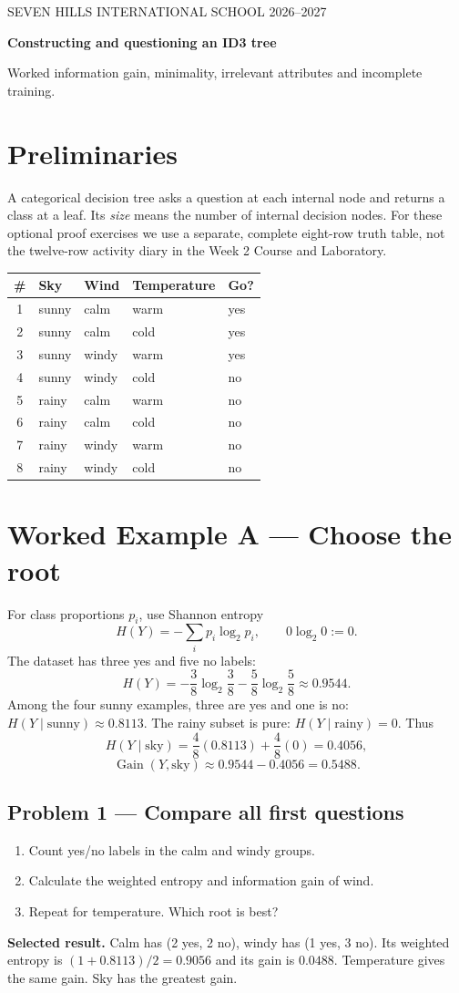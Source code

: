 \documentclass[11pt,a4paper]{article}
\newcommand{\problem}[1]{\subsection*{Problem #1}}
\begin{document}
{\small SEVEN HILLS INTERNATIONAL SCHOOL \hfill 2026--2027}

{\Large\bfseries Constructing and questioning an ID3 tree}\par
Worked information gain, minimality, irrelevant attributes and incomplete training.

\section*{Preliminaries}
A categorical decision tree asks a question at each internal node and returns a class at a leaf. Its \emph{size} means the number of internal decision nodes. For these optional proof exercises we use a separate, complete eight-row truth table, not the twelve-row activity diary in the Week 2 Course and Laboratory.

\begin{center}
\begin{tabular}{cllll}
\toprule
\# & Sky & Wind & Temperature & Go?\\\midrule
1 & sunny & calm & warm & yes\\
2 & sunny & calm & cold & yes\\
3 & sunny & windy & warm & yes\\
4 & sunny & windy & cold & no\\
5 & rainy & calm & warm & no\\
6 & rainy & calm & cold & no\\
7 & rainy & windy & warm & no\\
8 & rainy & windy & cold & no\\\bottomrule
\end{tabular}
\end{center}

\section*{Worked Example A --- Choose the root}
For class proportions $p_i$, use Shannon entropy
\[
H(Y)=-\sum_i p_i\log_2 p_i,\qquad 0\log_2 0:=0.
\]
The dataset has three yes and five no labels:
\[
H(Y)=-\frac38\log_2\frac38-\frac58\log_2\frac58\approx0.9544.
\]
Among the four sunny examples, three are yes and one is no: $H(Y\mid\text{sunny})\approx0.8113$. The rainy subset is pure: $H(Y\mid\text{rainy})=0$. Thus
\[
H(Y\mid\text{sky})=\frac48(0.8113)+\frac48(0)=0.4056,
\]
\[
\operatorname{Gain}(Y,\text{sky})\approx0.9544-0.4056=\boxed{0.5488}.
\]

\problem{1 --- Compare all first questions}
\begin{enumerate}[label=(\alph*)]
\item Count yes/no labels in the calm and windy groups.
\item Calculate the weighted entropy and information gain of wind.
\item Repeat for temperature. Which root is best?
\end{enumerate}
\textbf{Selected result.} Calm has (2 yes, 2 no), windy has (1 yes, 3 no). Its weighted entropy is $(1+0.8113)/2=0.9056$ and its gain is $0.0488$. Temperature gives the same gain. Sky has the greatest gain.
\end{document}
